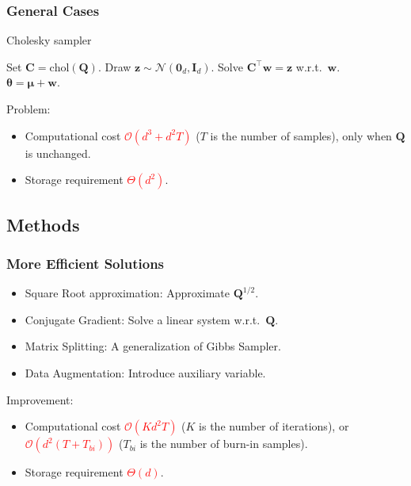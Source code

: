 \documentclass[aspectratio=169]{beamer}
\newcommand{\B}[1]{\mathbf{#1}} %
\newcommand{\Bs}[1]{\boldsymbol{#1}} %
\begin{document}
\begin{frame}
\frametitle{General Cases}
\begin{algorithm}[H]
\caption{Cholesky sampler}
\begin{algorithmic}[1]
\State Set $\B{C} = \mathrm{chol}(\B{Q})$.
\Comment{\textcolor{blue}{$\B{Q} = \B{C}\B{C}^{\top}$}}
\State Draw $\B{z} \sim \mathcal{N}(\B{0}_d,\B{I}_d)$.
\State Solve $\B{C}^{\top}\B{w} = \B{z}$ w.r.t.\ $\B{w}$.\\
\Return $\Bs{\theta} = \Bs{\mu} + \B{w}$.
\end{algorithmic}
\end{algorithm}
Problem: 
\begin{itemize}
\item Computational cost \textcolor{red}{\(\mathcal{O}(d^3 + d^2T)\)} (\(T\) is the number of samples), only when \(\B{Q}\) is unchanged.
\item Storage requirement \textcolor{red}{\(\Theta(d^2)\)}.
\end{itemize}
\end{frame}

\subsection{Methods}
\begin{frame}
\frametitle{More Efficient Solutions}
\begin{itemize}
    \item Square Root approximation: Approximate \(\B{Q}^{1/2}\).
    \item Conjugate Gradient: Solve a linear system w.r.t.\ \(\B{Q}\).
    \item Matrix Splitting: A generalization of Gibbs Sampler.
    \item Data Augmentation: Introduce auxiliary variable.
\end{itemize}
Improvement: 
\begin{itemize}
\item Computational cost \textcolor{red}{$\mathcal{O}(Kd^2T)$} (\(K\) is the number of iterations), or \textcolor{red}{$\mathcal{O}(d^2(T+T_{bi}))$} (\(T_{bi}\) is the number of burn-in samples).
\item Storage requirement \textcolor{red}{\(\Theta(d)\)}.
\end{itemize}
\end{frame}
\end{document}
